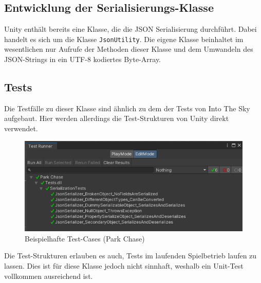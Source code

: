 \subsection{Entwicklung der Serialisierungs-Klasse}

Unity enthält bereits eine Klasse, die die JSON Serialisierung durchführt. Dabei handelt es sich um die Klasse \verb|JsonUtility|. Die eigene Klasse beinhaltet im wesentlichen nur Aufrufe der Methoden dieser Klasse und dem Umwandeln des JSON-Strings in ein UTF-8 kodiertes Byte-Array.

\subsection{Tests}

Die Testfälle zu dieser Klasse sind ähnlich zu dem der Tests von Into The Sky aufgebaut. Hier werden allerdings die Test-Strukturen von Unity direkt verwendet. 

\begin{figure}[!h]
	\centering
	\includegraphics[width=16cm]{figures/parkchasetests.png}
	\caption{Beispielhafte Test-Cases (Park Chase)}
	\label{fig:parkchasetests}
\end{figure}

Die Test-Strukturen erlauben es auch, Tests im laufenden Spielbetrieb laufen zu lassen. Dies ist für diese Klasse jedoch nicht sinnhaft, weshalb ein Unit-Test vollkommen ausreichend ist.

\newpage


